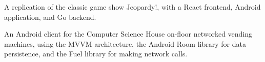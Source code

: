\documentclass[10pt,a4paper,ragged2e,withhyper]{altacv}
\begin{document}
        A replication of the classic game show Jeopardy!, with a React frontend, Android application, and Go backend. \smallskip \smallskip
        \newline
            
        \newline
        \divider
        
        An Android client for the Computer Science House on-floor networked vending machines, using the MVVM architecture, the Android Room library for data persistence, and the Fuel library for making network calls. \smallskip \smallskip
        \newline
           
        \newline
\end{document}
